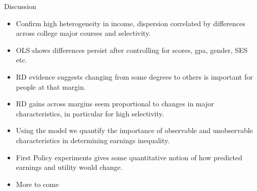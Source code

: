 \documentclass[table,10pt]{beamer}
\begin{document}
\begin{frame}{Discussion }
\begin{itemize}

  \item<1> Confirm high heterogeneity in income, dispersion correlated by differences across college major courses and selectivity.
  \medskip

  \item<2> OLS shows differences persist after controlling for scores, gpa, gender, SES etc.
  \medskip

  \item<3> RD evidence suggests changing from some degrees to others is important for people at that margin.
  \medskip

  \item<4> RD gains across margins seem proportional to changes in major characteristics, in particular for high selectivity.
  \medskip

  \item<5> Using the model we quantify the importance of observable and unobservable characteristics in determining earnings inequality.

  \item<6> First Policy experiments gives some quantitative notion of how predicted earnings and utility would change.
  
  \item<7> More to come
\end{itemize}

\end{frame}
\end{document}
